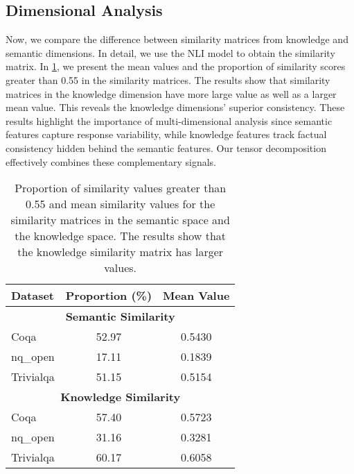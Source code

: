 \subsection{Dimensional Analysis}
Now, we compare the difference between similarity matrices from knowledge and semantic dimensions. In detail, we use the NLI model to obtain the similarity matrix. In \cref{tab:similarity_matrix_stat}, we present the mean values and the proportion of similarity scores greater than 0.55 in the similarity matrices. The results show that similarity matrices in the knowledge dimension have more large value as well as a larger mean value. This reveals the knowledge dimensions' superior consistency. These results highlight the importance of multi-dimensional analysis since semantic features capture response variability, while knowledge features track factual consistency hidden behind the semantic features. Our tensor decomposition effectively combines these complementary signals.

\begin{table}[t!]
    \centering
    \begin{tabular}{lcc}
        \toprule
        Dataset & Proportion (\%) & Mean Value \\
        \midrule
        \multicolumn{3}{c}{\textbf{Semantic Similarity}} \\
        \midrule
        Coqa & 52.97 & 0.5430 \\
        nq\_open & 17.11 & 0.1839 \\
        Trivialqa & 51.15 & 0.5154 \\
        \midrule
        \multicolumn{3}{c}{\textbf{Knowledge Similarity}} \\
        \midrule
        Coqa & 57.40 & 0.5723 \\
        nq\_open & 31.16 & 0.3281 \\
        Trivialqa & 60.17 & 0.6058 \\
        \bottomrule
    \end{tabular}
    \caption{Proportion of similarity values greater than 0.55 and mean similarity values for the similarity matrices in the semantic space and the knowledge space. The results show that the knowledge similarity matrix has larger values.}
    \vspace{-10mm}
    \label{tab:similarity_matrix_stat}
\end{table}